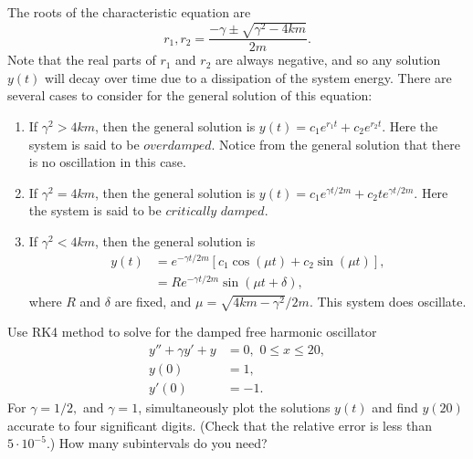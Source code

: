 The roots of the characteristic equation are \[r_1,r_2 = \frac{-\gamma \pm \sqrt{\gamma^2 -4km}}{2m} .\]
Note that the real parts of $r_1$ and $r_2$ are always negative, and so any solution $y(t)$ will decay over time due to a dissipation of the system energy. There are several cases to consider for the general solution of this equation:
\begin{enumerate}
\item If $\gamma^2 > 4km$, then the general solution is $y(t) = c_1 e^{r_1t} + c_2e^{r_2t}$. Here the system is said to be $\textit{overdamped}$. Notice from the general solution that there is no oscillation in this case.
\item If $\gamma^2 = 4km$, then the general solution is $y(t) = c_1 e^{\gamma t/2m} + c_2 te^{\gamma t/2m}$. Here the system is said to be $\textit{critically damped}$.
\item If $\gamma^2 < 4km$, then the general solution is
\begin{align*}
y(t) &= e^{-\gamma t/2m} \left[c_1\cos(\mu t) + c_2 \sin (\mu t)\right],\\
&= R e^{-\gamma t/2m}  \sin (\mu t + \delta),
\end{align*}
where $R$ and $\delta$ are fixed, and $\mu = \sqrt{4km-\gamma^2}/2m.$ This system does oscillate.
\end{enumerate}

\begin{problem}
Use RK4 method to solve for the damped free harmonic oscillator
\begin{align*}
y'' +\gamma y'+ y &= 0, \,\, 0 \leq x \leq 20,\\
y(0) &= 1, \\
y'(0) &= -1.
\end{align*}
For $\gamma = 1/2,$ and $\gamma = 1$, simultaneously plot the solutions $y(t)$ and find $y(20)$ accurate to four significant digits. (Check that the relative error is less than $5 \cdot 10^{-5}$.)  How many subintervals do you need?
\end{problem}

